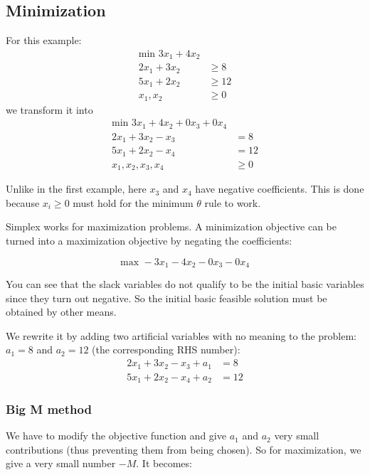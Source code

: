 \documentclass[a4paper, 12pt]{article}
\begin{document}
\subsection{Minimization}

For this example:
\begin{align*}
    \text{min } 3x_1 + 4x_2 \\
    2x_1 + 3x_2 &\ge 8 \\
    5x_1 + 2x_2 &\ge 12 \\
    x_1,x_2 &\ge 0
\end{align*}
we transform it into
\begin{align*}
    \text{min } 3x_1 + 4x_2 + 0x_3 + 0x_4 \\
    2x_1 + 3x_2 - x_3 &= 8 \\
    5x_1 + 2x_2 - x_4 &= 12 \\
    x_1,x_2,x_3,x_4 &\ge 0
\end{align*}

Unlike in the first example, here $x_3$ and $x_4$ have negative coefficients. This
is done because $x_i \ge 0$ must hold for the minimum $\theta$ rule to work.

Simplex works for maximization problems. A minimization objective can be turned
into a maximization objective by negating the coefficients:

\begin{equation*}
    \text{max } -3x_1 - 4x_2 - 0x_3 - 0x_4
\end{equation*}

You can see that the slack variables do not qualify to be the initial basic
variables since they turn out negative. So the initial basic feasible solution
must be obtained by other means.

We rewrite it by adding two artificial variables with no meaning to the
problem: $a_1 = 8$ and $a_2 = 12$ (the corresponding RHS number):
\begin{align*}
    2x_1 + 3x_2 - x_3 + a_1 &= 8 \\
    5x_1 + 2x_2 - x_4 + a_2 &= 12
\end{align*}

\subsubsection{Big M method}

We have to modify the objective function and give $a_1$ and $a_2$ very small
contributions (thus preventing them from being chosen). So for maximization,
we give a very small number $-M$. It becomes:
\end{document}
